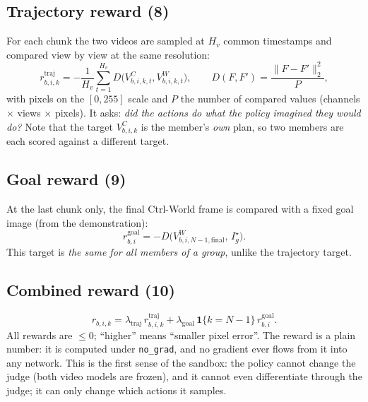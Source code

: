 \documentclass[11pt,a4paper]{article}
\newcommand{\VC}{V^{C}}
\newcommand{\VW}{V^{W}}
\newcommand{\eqp}[1]{\textup{(#1)}} %
\theoremstyle{remark}
\begin{document}
\subsection{Trajectory reward \eqp{8}}
For each chunk the two videos are sampled at $H_v$ common timestamps and compared view by view at the same resolution:
\begin{equation}
r^{\mathrm{traj}}_{b,i,k}=-\frac1{H_v}\sum_{t=1}^{H_v}D\big(\VC_{b,i,k,t},\VW_{b,i,k,t}\big),\qquad
D(F,F')=\frac{\|F-F'\|_2^2}{P},
\label{eq:traj}
\end{equation}
with pixels on the $[0,255]$ scale and $P$ the number of compared values (channels $\times$ views $\times$ pixels). It asks: \emph{did the actions do what the policy imagined they would do?} Note that the target $\VC_{b,i,k}$ is the member's \emph{own} plan, so two members are each scored against a different target.

\subsection{Goal reward \eqp{9}}
At the last chunk only, the final Ctrl-World frame is compared with a fixed goal image (from the demonstration):
\begin{equation}
r^{\mathrm{goal}}_{b,i}=-D\big(\VW_{b,i,N-1,\mathrm{final}},\,I^\star_{g}\big).
\end{equation}
This target is \emph{the same for all members of a group}, unlike the trajectory target.

\subsection{Combined reward \eqp{10}}
\begin{equation}
r_{b,i,k}=\lambda_{\mathrm{traj}}\,r^{\mathrm{traj}}_{b,i,k}+\lambda_{\mathrm{goal}}\,\mathbf 1\{k=N-1\}\,r^{\mathrm{goal}}_{b,i}.
\label{eq:reward}
\end{equation}
All rewards are $\le0$; ``higher'' means ``smaller pixel error''. The reward is a plain number: it is computed under \texttt{no\_grad}, and no gradient ever flows from it into any network. This is the first sense of the sandbox: the policy cannot change the judge (both video models are frozen), and it cannot even differentiate through the judge; it can only change which actions it samples.
\end{document}
